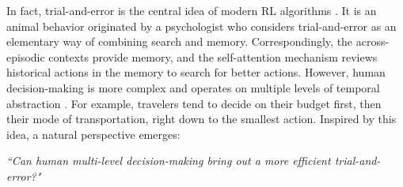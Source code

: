 In fact, trial-and-error is the central idea of modern RL algorithms \cite{16}. It is an animal behavior originated by a psychologist \citet{17} who considers trial-and-error as an elementary way of combining search and memory. Correspondingly, the across-episodic contexts provide memory, and the self-attention mechanism reviews historical actions in the memory to search for better actions. However, human decision-making is more complex and operates on multiple levels of temporal abstraction \cite{12}. For example, travelers tend to decide on their budget first, then their mode of transportation, right down to the smallest action. Inspired by this idea, a natural perspective emerges: 
\vspace{-5pt}
\begin{center}
\emph{``Can human multi-level decision-making bring out a more efficient trial-and-error?"}
\end{center}
\vspace{-5pt}


